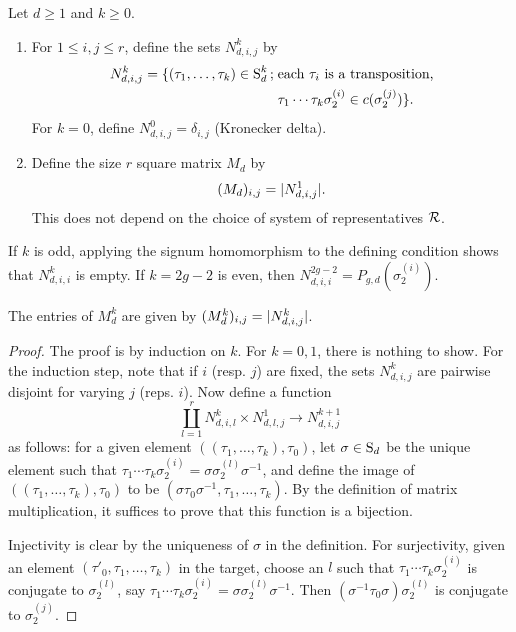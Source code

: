 \begin{defi}
 Let $d\geq 1$ and $k\geq 0$.
 \begin{enumerate}
  \item For $1\leq i,j\leq r$, define the sets $N_{d,i,j}^k$ by
  \begin{align*}
   N_{d,i,j}^k = \{(\tau_1,\dotsc,\tau_k)\in \operatorname{S}_d^{k} \,;\; &\text{each }\tau_i\text{ is a transposition,}\\ &\tau_1\dotsm\tau_k\sigma_2^{(i)}\in c(\sigma_2^{(j)})\}.
  \end{align*}
  For $k=0$, define $N_{d,i,j}^0=\delta_{i,j}$ (Kronecker delta).
  \item Define the size $r$ square matrix $M_d$ by
  \[
   (M_d)_{i,j}=|N_{d,i,j}^1|.
  \]
  This does not depend on the choice of system of representatives $\mathcal{R}$.
 \end{enumerate}
\end{defi}

\begin{rmk}
 If $k$ is odd, applying the signum homomorphism to the defining condition shows that $N_{d,i,i}^k$ is empty. If $k=2g-2$ is even, then $N_{d,i,i}^{2g-2}=P_{g,d}(\sigma_2^{(i)})$.
\end{rmk}

\begin{prop}
 The entries of $M_d^k$ are given by $(M_d^k)_{i,j}=|N_{d,i,j}^k|$.
\end{prop}
\begin{proof}
 The proof is by induction on $k$. For $k=0,1$, there is nothing to show. For the induction step, note that if $i$ (resp. $j$) are fixed, the sets $N_{d,i,j}^k$ are pairwise disjoint for varying $j$ (reps. $i$). Now define a function
 \[
  \coprod_{l=1}^r N_{d,i,l}^k \times N_{d,l,j}^1 \to N_{d,i,j}^{k+1}
 \]
 as follows: for a given element $((\tau_1,\dotsc,\tau_k),\tau_0)$, let $\sigma\in\operatorname{S}_d$ be the unique element such that $\tau_1\dotsm\tau_k\sigma_2^{(i)}=\sigma\sigma_2^{(l)}\sigma^{-1}$, and define the image of $((\tau_1,\dotsc,\tau_k),\tau_0)$ to be $(\sigma\tau_0\sigma^{-1},\tau_1,\dotsc,\tau_k)$. By the definition of matrix multiplication, it suffices to prove that this function is a bijection.
 
 Injectivity is clear by the uniqueness of $\sigma$ in the definition. For surjectivity, given an element $(\tau'_0,\tau_1,\dotsc,\tau_k)$ in the target, choose an $l$ such that $\tau_1\dotsm\tau_k\sigma_2^{(i)}$ is conjugate to $\sigma_2^{(l)}$, say $\tau_1\dotsm\tau_k\sigma_2^{(i)}=\sigma\sigma_2^{(l)}\sigma^{-1}$. Then $(\sigma^{-1}\tau_0\sigma)\sigma_2^{(l)}$ is conjugate to $\sigma_2^{(j)}$.
\end{proof}

